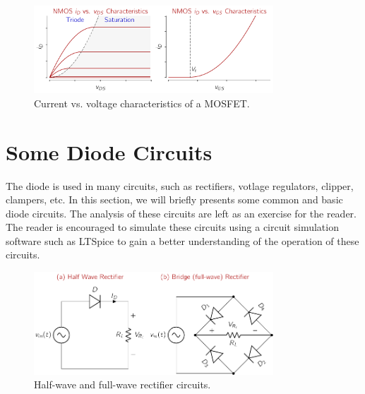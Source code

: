 \begin{figure}[t]
    \centering
    \includegraphics[width=0.8\textwidth]{figures/ch03/fig03-mosfet-iv-curves.pdf}
    \caption{Current vs. voltage characteristics of a MOSFET.}
    \label{fig:03-mosfet-iv-curves}
\end{figure}

\section{Some Diode Circuits}
The diode is used in many circuits, such as rectifiers, votlage regulators, clipper, clampers, etc. In this section, we will briefly presents some common and basic diode circuits. The analysis of these circuits are left as an exercise for the reader. The reader is encouraged to simulate these circuits using a circuit simulation software such as LTSpice to gain a better understanding of the operation of these circuits.
\begin{figure}[b]
    \centering
    \includegraphics[width=0.8\textwidth]{figures/ch03/fig03-diode-ckt-hlfwaverect.pdf}
    \caption{Half-wave and full-wave rectifier circuits.}
    \label{fig:03-diode-ckt-hlfwaverect}
\end{figure}


